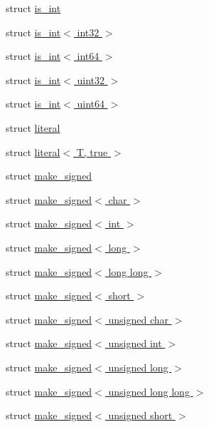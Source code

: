 \begin{DoxyCompactItemize}
\item 
struct \hyperlink{structglm_1_1detail_1_1is__int}{is\+\_\+int}
\item 
struct \hyperlink{structglm_1_1detail_1_1is__int_3_01int32_01_4}{is\+\_\+int$<$ int32 $>$}
\item 
struct \hyperlink{structglm_1_1detail_1_1is__int_3_01int64_01_4}{is\+\_\+int$<$ int64 $>$}
\item 
struct \hyperlink{structglm_1_1detail_1_1is__int_3_01uint32_01_4}{is\+\_\+int$<$ uint32 $>$}
\item 
struct \hyperlink{structglm_1_1detail_1_1is__int_3_01uint64_01_4}{is\+\_\+int$<$ uint64 $>$}
\item 
struct \hyperlink{structglm_1_1detail_1_1literal}{literal}
\item 
struct \hyperlink{structglm_1_1detail_1_1literal_3_01_t_00_01true_01_4}{literal$<$ T, true $>$}
\item 
struct \hyperlink{structglm_1_1detail_1_1make__signed}{make\+\_\+signed}
\item 
struct \hyperlink{structglm_1_1detail_1_1make__signed_3_01char_01_4}{make\+\_\+signed$<$ char $>$}
\item 
struct \hyperlink{structglm_1_1detail_1_1make__signed_3_01int_01_4}{make\+\_\+signed$<$ int $>$}
\item 
struct \hyperlink{structglm_1_1detail_1_1make__signed_3_01long_01_4}{make\+\_\+signed$<$ long $>$}
\item 
struct \hyperlink{structglm_1_1detail_1_1make__signed_3_01long_01long_01_4}{make\+\_\+signed$<$ long long $>$}
\item 
struct \hyperlink{structglm_1_1detail_1_1make__signed_3_01short_01_4}{make\+\_\+signed$<$ short $>$}
\item 
struct \hyperlink{structglm_1_1detail_1_1make__signed_3_01unsigned_01char_01_4}{make\+\_\+signed$<$ unsigned char $>$}
\item 
struct \hyperlink{structglm_1_1detail_1_1make__signed_3_01unsigned_01int_01_4}{make\+\_\+signed$<$ unsigned int $>$}
\item 
struct \hyperlink{structglm_1_1detail_1_1make__signed_3_01unsigned_01long_01_4}{make\+\_\+signed$<$ unsigned long $>$}
\item 
struct \hyperlink{structglm_1_1detail_1_1make__signed_3_01unsigned_01long_01long_01_4}{make\+\_\+signed$<$ unsigned long long $>$}
\item 
struct \hyperlink{structglm_1_1detail_1_1make__signed_3_01unsigned_01short_01_4}{make\+\_\+signed$<$ unsigned short $>$}

\end{DoxyCompactItemize}
